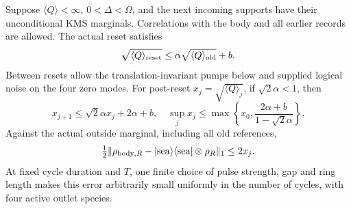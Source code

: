 \begin{proposition}
\label{prop:ring-renewal}
Suppose $\langle Q\rangle<\infty$, $0<\Delta<\Omega$, and the next
incoming supports have their unconditional KMS marginals. Correlations
with the body and all earlier records are allowed. The actual reset
satisfies
\begin{equation}
 \sqrt{\langle Q\rangle_{\rm reset}}
       \le\alpha\sqrt{\langle Q\rangle_{\rm old}}+b.
 \label{eq:ring-contraction}
\end{equation}
Between resets allow the translation-invariant pumps below and supplied
logical noise on the four zero modes. For post-reset
$x_j=\sqrt{\langle Q\rangle_j}$, if $\sqrt2\alpha<1$, then
\begin{equation}
 x_{j+1}\le\sqrt2\alpha x_j+2\alpha+b,
 \quad\sup_jx_j\le\max\left\{x_0,
                   \frac{2\alpha+b}{1-\sqrt2\alpha}\right\}.
 \label{eq:ring-uniform}
\end{equation}
Against the actual outside marginal, including all old references,
\begin{equation}
 \tfrac12\|\rho_{{\rm body},R}-|{\rm sea}\rangle\langle{\rm sea}|
                             \otimes\rho_R\|_1\le2x_j.
 \label{eq:ring-decouple}
\end{equation}
At fixed cycle duration and $T$, one finite choice of pulse strength,
gap and ring length makes this error arbitrarily small uniformly in
the number of cycles, with four active outlet species.
\end{proposition}
